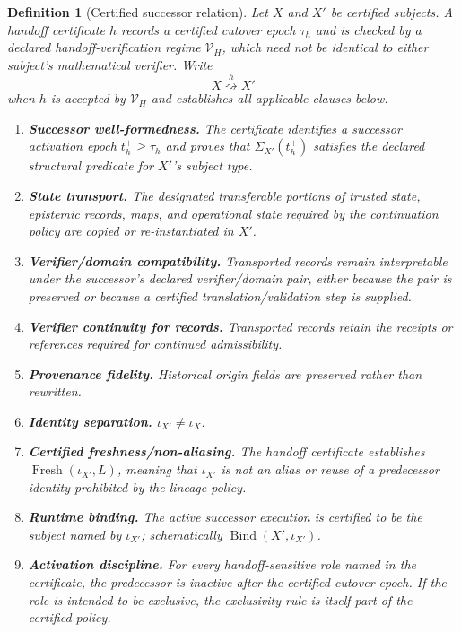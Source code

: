 \documentclass[11pt]{article}
\newtheorem{definition}{Definition}[section]
\theoremstyle{remark}
\newcommand{\Fresh}{\operatorname{Fresh}}
\newcommand{\Bind}{\operatorname{Bind}}
\newcommand{\handoff}{\mathrel{\overset{h}{\rightsquigarrow}}}
\begin{document}
\begin{definition}[Certified successor relation]
Let $X$ and $X'$ be certified subjects. A handoff certificate $h$ records a certified cutover epoch $\tau_h$ and is checked by a declared handoff-verification regime $\mathcal V_H$, which need not be identical to either subject's mathematical verifier. Write
\[
X\handoff X'
\]
when $h$ is accepted by $\mathcal V_H$ and establishes all applicable clauses below.
\begin{enumerate}[label=(H\arabic*)]
\item \textbf{Successor well-formedness.} The certificate identifies a successor activation epoch $t_h^+\geq\tau_h$ and proves that $\Sigma_{X'}(t_h^+)$ satisfies the declared structural predicate for $X'$'s subject type.
\item \textbf{State transport.} The designated transferable portions of trusted state, epistemic records, maps, and operational state required by the continuation policy are copied or re-instantiated in $X'$.
\item \textbf{Verifier/domain compatibility.} Transported records remain interpretable under the successor's declared verifier/domain pair, either because the pair is preserved or because a certified translation/validation step is supplied.
\item \textbf{Verifier continuity for records.} Transported records retain the receipts or references required for continued admissibility.
\item \textbf{Provenance fidelity.} Historical origin fields are preserved rather than rewritten.
\item \textbf{Identity separation.} $\iota_{X'}\neq\iota_X$.
\item \textbf{Certified freshness/non-aliasing.} The handoff certificate establishes $\Fresh(\iota_{X'},L)$, meaning that $\iota_{X'}$ is not an alias or reuse of a predecessor identity prohibited by the lineage policy.
\item \textbf{Runtime binding.} The active successor execution is certified to be the subject named by $\iota_{X'}$; schematically $\Bind(X',\iota_{X'})$.
\item \textbf{Activation discipline.} For every handoff-sensitive role named in the certificate, the predecessor is inactive after the certified cutover epoch. If the role is intended to be exclusive, the exclusivity rule is itself part of the certified policy.
\end{enumerate}
\end{definition}
\end{document}
